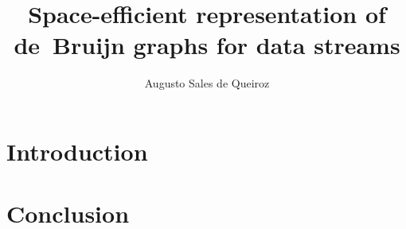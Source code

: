 \documentclass[bsc,en]{ufpethesis}
\institute{Centro de Informática}
\author{Augusto Sales de Queiroz}
\title{Space-efficient representation of de~Bruijn graphs for data streams}
\begin{document}
    \linenumbers
    \frontmatter
    \frontpage
    \presentationpage
    \tableofcontents

    \mainmatter
	\linenumbers
	\doublespacing
    \chapter{Introduction}
    
    
    
    \chapter{Conclusion}

    \backmatter
    
    
\end{document}
